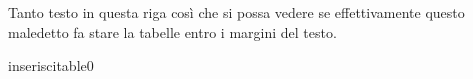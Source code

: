 \documentclass[a4paper]{article}
\newcommand{\SRE}{inserisci}
\begin{document}
Tanto testo in questa riga così che si possa vedere se effettivamente questo maledetto fa stare la tabelle entro i margini del testo.
\begin{centering}
\tabulinesep=1.5mm
\SRE{table0}
\end {centering}
\end{document}
